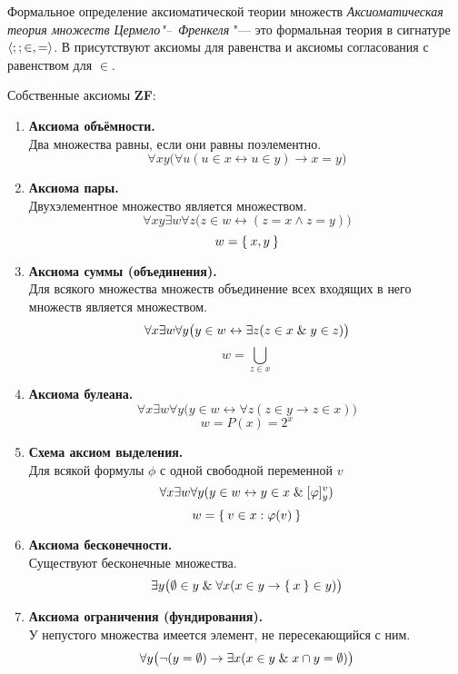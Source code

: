\begin{undefthm}{Формальное определение аксиоматической теории множеств}
	\emph{Аксиоматическая теория множеств Цермело"--~Френкеля}  "--- это формальная теория в сигнатуре $ \Braket{;; \in, =} $.
	В  присутствуют аксиомы для равенства и аксиомы согласования с равенством для $ \in $.

	Собственные аксиомы \textbf{ZF}:
	\begin{enumerate}
		\item \textbf{Аксиома объёмности.} \\
			Два множества равны, если они равны поэлементно.
			$$ \forall x y \bigl( \forall u (u \in x \leftrightarrow u \in y) \to x = y \bigr) $$

		\item \textbf{Аксиома пары.} \\
			Двухэлементное множество является множеством.
			$$ \forall xy \exists w \forall z \bigl( z \in w \leftrightarrow (z = x \wedge z = y) \bigr) $$
			$$ w = \Set{x, y} $$

		\item \textbf{Аксиома суммы (объединения).} \\
			Для всякого множества множеств объединение всех входящих в него множеств является множеством.
			$$ \forall x \exists w \forall y \bigl( y \in w \leftrightarrow \exists z (z \in x \mathrel\& y \in z) \bigr) $$
			$$ w = \bigcup_{z \in x} $$

		\item \textbf{Аксиома булеана.}
			$$ \forall x \exists w \forall y \bigl( y \in w \leftrightarrow \forall z (z \in y \to z \in x) \bigr) $$
			$$ w = P(x) = 2^x $$

		\item \textbf{Схема аксиом выделения.} \\
			Для всякой формулы $ \phi $ с одной свободной переменной $ v $
			$$ \forall x \exists w \forall y (y \in w \leftrightarrow y \in x \mathrel\& [\varphi]_y^v) $$
			$$ w = \Set{v \in x : \varphi(v)} $$

		\item \textbf{Аксиома бесконечности.} \\
			Существуют бесконечные множества.
			$$ \exists y \bigl( \emptyset \in y \mathrel\& \forall x ( x \in y \to \Set{x} \in y) \bigr) $$

		\item \textbf{Аксиома ограничения (фундирования).} \\
			У непустого множества имеется элемент, не пересекающийся с ним.
			$$ \forall y \bigl( \neg (y = \emptyset) \to \exists x(x \in y \mathrel\& x \cap y = \emptyset) \bigr) $$


\end{enumerate}
\end{undefthm}
